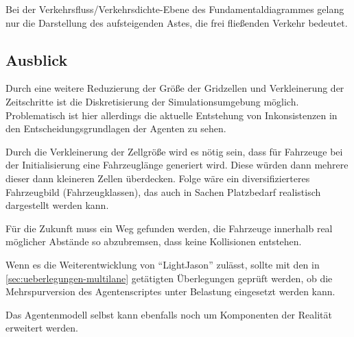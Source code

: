 Bei der Verkehrsfluss/Verkehrsdichte-Ebene des Fundamentaldiagrammes gelang nur die Darstellung des aufsteigenden Astes, die frei fließenden Verkehr bedeutet.






\subsection{Ausblick}
\label{sec:ausblick}

Durch eine weitere Reduzierung der Größe der Gridzellen und Verkleinerung der Zeitschritte ist die Diskretisierung der Simulationsumgebung möglich.
Problematisch ist hier allerdings die aktuelle Entstehung von Inkonsistenzen in den Entscheidungsgrundlagen der Agenten zu sehen.

Durch die Verkleinerung der Zellgröße wird es nötig sein, dass für Fahrzeuge bei der Initialisierung eine Fahrzeuglänge generiert wird.
Diese würden dann mehrere dieser dann kleineren Zellen überdecken.
Folge wäre ein diversifizierteres Fahrzeugbild (Fahrzeugklassen), das auch in Sachen Platzbedarf realistisch dargestellt werden kann.

Für die Zukunft muss ein Weg gefunden werden, die Fahrzeuge innerhalb real möglicher Abstände so abzubremsen, dass keine Kollisionen entstehen. 

Wenn es die Weiterentwicklung von \enquote{LightJason} zulässt, sollte mit den in \cref{sec:ueberlegungen-multilane} getätigten Überlegungen geprüft werden, ob die Mehrspurversion des Agentenscriptes unter Belastung eingesetzt werden kann.

Das Agentenmodell selbst kann ebenfalls noch um Komponenten der Realität erweitert werden.

